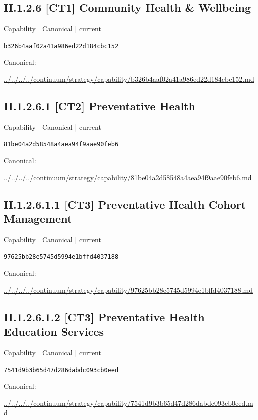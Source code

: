 \documentclass[10pt,a4paper]{article}
\begin{document}
\subsection*{II.1.2.6 [CT1] Community Health \& Wellbeing}
{\small Capability | Canonical | current}\par
\texttt{b326b4aaf02a41a986ed22d184cbc152}\par
Canonical: \par
{\footnotesize\url{../../../../continuum/strategy/capability/b326b4aaf02a41a986ed22d184cbc152.md}}\par
\subsection*{II.1.2.6.1 [CT2] Preventative Health}
{\small Capability | Canonical | current}\par
\texttt{81be04a2d58548a4aea94f9aae90feb6}\par
Canonical: \par
{\footnotesize\url{../../../../continuum/strategy/capability/81be04a2d58548a4aea94f9aae90feb6.md}}\par
\subsection*{II.1.2.6.1.1 [CT3] Preventative Health Cohort Management}
{\small Capability | Canonical | current}\par
\texttt{97625bb28e5745d5994e1bffd4037188}\par
Canonical: \par
{\footnotesize\url{../../../../continuum/strategy/capability/97625bb28e5745d5994e1bffd4037188.md}}\par
\subsection*{II.1.2.6.1.2 [CT3] Preventative Health Education Services}
{\small Capability | Canonical | current}\par
\texttt{7541d9b3b65d47d286dabdc093cb0eed}\par
Canonical: \par
{\footnotesize\url{../../../../continuum/strategy/capability/7541d9b3b65d47d286dabdc093cb0eed.md}}\par
\end{document}
